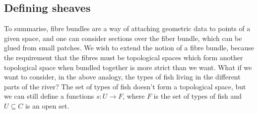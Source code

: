 \subsection{Defining sheaves}
To summarise, fibre bundles are a way of attaching geometric data to
points of a given space, and one can consider sections over the fiber
bundle, which can be glued from small patches. We wish to extend the notion
of a fibre bundle, because the requirement that the fibres must be
topological spaces which form another topological space when bundled
together is more strict than we want. What if we want to consider, in
the above analogy, the types of fish living in the different parts of the
river? The set of types of fish doesn't form a topological space, but we
can still define a functions $s:U\to F$, where $F$ is the set of types
of fish and $U\subseteq C$ is an open set.

